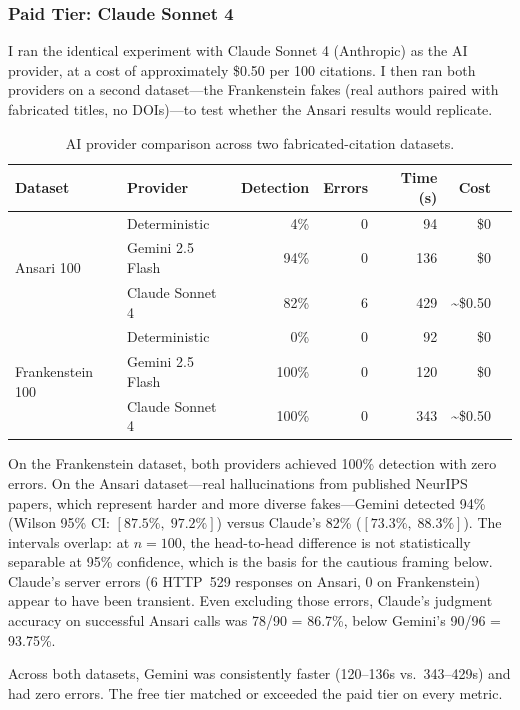 \subsubsection{Paid Tier: Claude Sonnet 4}

I ran the identical experiment with Claude Sonnet 4 (Anthropic) as the AI provider, at a cost of approximately \$0.50 per 100 citations. I then ran both providers on a second dataset---the Frankenstein fakes (real authors paired with fabricated titles, no DOIs)---to test whether the Ansari results would replicate.

\begin{table}[H]
\centering
\caption{AI provider comparison across two fabricated-citation datasets.}
\label{tab:ai-comparison}
\begin{tabular}{@{}llrrrrl@{}}
\toprule
\textbf{Dataset} & \textbf{Provider} & \textbf{Detection} & \textbf{Errors} & \textbf{Time (s)} & \textbf{Cost} \\
\midrule
\multirow{3}{*}{Ansari 100}
  & Deterministic      &   4\% & 0 &  94 & \$0 \\
  & Gemini 2.5 Flash   &  94\% & 0 & 136 & \$0 \\
  & Claude Sonnet 4    &  82\% & 6 & 429 & \textasciitilde\$0.50 \\
\midrule
\multirow{3}{*}{Frankenstein 100}
  & Deterministic      &   0\% & 0 &  92 & \$0 \\
  & Gemini 2.5 Flash   & 100\% & 0 & 120 & \$0 \\
  & Claude Sonnet 4    & 100\% & 0 & 343 & \textasciitilde\$0.50 \\
\bottomrule
\end{tabular}
\end{table}

On the Frankenstein dataset, both providers achieved 100\% detection with zero errors. On the Ansari dataset---real hallucinations from published NeurIPS papers, which represent harder and more diverse fakes---Gemini detected 94\% (Wilson 95\% CI: $[87.5\%,\;97.2\%]$) versus Claude's 82\% ($[73.3\%,\;88.3\%]$). The intervals overlap: at $n=100$, the head-to-head difference is not statistically separable at 95\% confidence, which is the basis for the cautious framing below. Claude's server errors (6 HTTP~529 responses on Ansari, 0 on Frankenstein) appear to have been transient. Even excluding those errors, Claude's judgment accuracy on successful Ansari calls was 78/90 = 86.7\%, below Gemini's 90/96 = 93.75\%.

Across both datasets, Gemini was consistently faster (120--136s vs.\ 343--429s) and had zero errors. The free tier matched or exceeded the paid tier on every metric.

